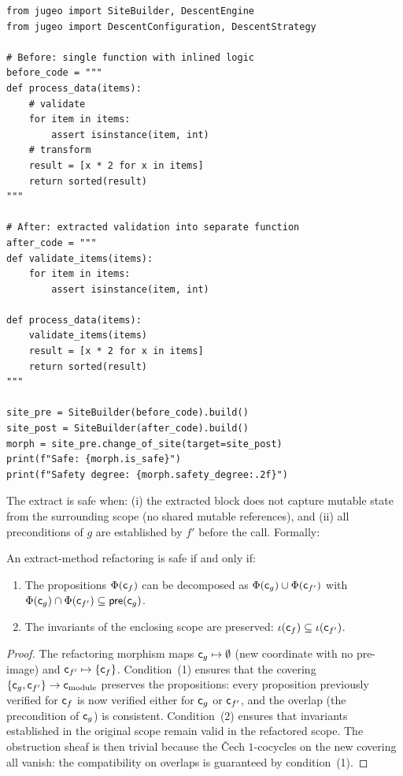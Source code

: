 \documentclass[11pt]{article}
\newcommand{\props}{\Phi}                           %
\newcommand{\precond}{\mathsf{pre}}                  %
\newcommand{\inv}{\iota}                             %
\begin{document}
\begin{lstlisting}[style=jugeo-python]
from jugeo import SiteBuilder, DescentEngine
from jugeo import DescentConfiguration, DescentStrategy

# Before: single function with inlined logic
before_code = """
def process_data(items):
    # validate
    for item in items:
        assert isinstance(item, int)
    # transform
    result = [x * 2 for x in items]
    return sorted(result)
"""

# After: extracted validation into separate function
after_code = """
def validate_items(items):
    for item in items:
        assert isinstance(item, int)

def process_data(items):
    validate_items(items)
    result = [x * 2 for x in items]
    return sorted(result)
"""

site_pre = SiteBuilder(before_code).build()
site_post = SiteBuilder(after_code).build()
morph = site_pre.change_of_site(target=site_post)
print(f"Safe: {morph.is_safe}")
print(f"Safety degree: {morph.safety_degree:.2f}")
\end{lstlisting}

The extract is safe when: (i) the extracted block does not capture
mutable state from the surrounding scope (no shared mutable references),
and (ii) all preconditions of $g$ are established by $f'$ before the
call.  Formally:

\begin{proposition}\label{prop:extract-safe}
An extract-method refactoring is safe if and only if:
\begin{enumerate}[noitemsep]
  \item The propositions $\props(\coord_f)$ can be decomposed as
        $\props(\coord_g) \cup \props(\coord_{f'})$ with
        $\props(\coord_g) \cap \props(\coord_{f'}) \subseteq
        \precond(\coord_g)$.
  \item The invariants of the enclosing scope are preserved:
        $\inv(\coord_f) \subseteq \inv(\coord_{f'})$.
\end{enumerate}
\end{proposition}

\begin{proof}
The refactoring morphism maps $\mathsf{c}_g \mapsto \emptyset$ (new
coordinate with no pre-image) and $\mathsf{c}_{f'} \mapsto \{\mathsf{c}_f\}$.
Condition~(1) ensures that the covering $\{\mathsf{c}_g, \mathsf{c}_{f'}\} \to
\mathsf{c}_{\mathrm{module}}$ preserves the propositions: every proposition
previously verified for $\mathsf{c}_f$ is now verified either for
$\mathsf{c}_g$ or $\mathsf{c}_{f'}$, and the overlap (the precondition of
$\mathsf{c}_g$) is consistent.  Condition~(2) ensures that invariants
established in the original scope remain valid in the refactored scope.
The obstruction sheaf is then trivial because the Čech $1$-cocycles on
the new covering all vanish: the compatibility on overlaps is guaranteed
by condition~(1).
\end{proof}
\end{document}

